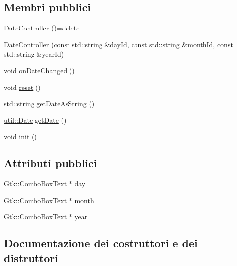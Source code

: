 \subsection*{Membri pubblici}
\begin{DoxyCompactItemize}
\item 
\mbox{\hyperlink{structmm_1_1_date_controller_a3244d913ab9d7b96e9617f8711e34bd8}{Date\+Controller}} ()=delete
\item 
\mbox{\hyperlink{structmm_1_1_date_controller_a591167277348214a72634a4bbc9272ad}{Date\+Controller}} (const std\+::string \&day\+Id, const std\+::string \&month\+Id, const std\+::string \&year\+Id)
\item 
void \mbox{\hyperlink{structmm_1_1_date_controller_a7474c420c78178ee6ee6a2e66c16803f}{on\+Date\+Changed}} ()
\item 
void \mbox{\hyperlink{structmm_1_1_date_controller_a9e09c31aa55c3389c6919c716bb8b0dc}{reset}} ()
\item 
std\+::string \mbox{\hyperlink{structmm_1_1_date_controller_a8ebf6bda6699414521e4e299fd59e843}{get\+Date\+As\+String}} ()
\item 
\mbox{\hyperlink{structmm_1_1util_1_1_date}{util\+::\+Date}} \mbox{\hyperlink{structmm_1_1_date_controller_aa3c0122bfcc36e8d8b43c8ca7ca76197}{get\+Date}} ()
\item 
void \mbox{\hyperlink{structmm_1_1_date_controller_aa7f999d2d5afec5c6724f92cf2856171}{init}} ()
\end{DoxyCompactItemize}
\subsection*{Attributi pubblici}
\begin{DoxyCompactItemize}
\item 
Gtk\+::\+Combo\+Box\+Text $\ast$ \mbox{\hyperlink{structmm_1_1_date_controller_a332df89b4a88fe3ace3d6d86934a575d}{day}}
\item 
Gtk\+::\+Combo\+Box\+Text $\ast$ \mbox{\hyperlink{structmm_1_1_date_controller_a1e7373cef0b00e63343ef9d30a1e80c5}{month}}
\item 
Gtk\+::\+Combo\+Box\+Text $\ast$ \mbox{\hyperlink{structmm_1_1_date_controller_a36179406cda47b8c18d1a84945a5e61c}{year}}
\end{DoxyCompactItemize}


\subsection{Documentazione dei costruttori e dei distruttori}
\mbox{\label{structmm_1_1_date_controller_a3244d913ab9d7b96e9617f8711e34bd8}} 
